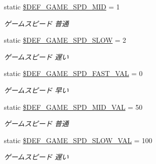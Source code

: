 \begin{DoxyCompactItemize}
static \hyperlink{class_reversi_const_a193b49bd2c83732144f045f9a50aa33e}{\$\+D\+E\+F\+\_\+\+G\+A\+M\+E\+\_\+\+S\+P\+D\+\_\+\+M\+ID} = 1
\begin{DoxyCompactList}\small\item\em ゲームスピード 普通 \end{DoxyCompactList}\item 
\mbox{\label{class_reversi_const_a0b3dc06c436244edd6720ad50a6eb673}} 
static \hyperlink{class_reversi_const_a0b3dc06c436244edd6720ad50a6eb673}{\$\+D\+E\+F\+\_\+\+G\+A\+M\+E\+\_\+\+S\+P\+D\+\_\+\+S\+L\+OW} = 2
\begin{DoxyCompactList}\small\item\em ゲームスピード 遅い \end{DoxyCompactList}\item 
\mbox{\label{class_reversi_const_a482c8f8dd0e67619fda3f134ab0a011c}} 
static \hyperlink{class_reversi_const_a482c8f8dd0e67619fda3f134ab0a011c}{\$\+D\+E\+F\+\_\+\+G\+A\+M\+E\+\_\+\+S\+P\+D\+\_\+\+F\+A\+S\+T\+\_\+\+V\+AL} = 0
\begin{DoxyCompactList}\small\item\em ゲームスピード 早い \end{DoxyCompactList}\item 
\mbox{\label{class_reversi_const_ac370025cba197235c70bb8adf896adf8}} 
static \hyperlink{class_reversi_const_ac370025cba197235c70bb8adf896adf8}{\$\+D\+E\+F\+\_\+\+G\+A\+M\+E\+\_\+\+S\+P\+D\+\_\+\+M\+I\+D\+\_\+\+V\+AL} = 50
\begin{DoxyCompactList}\small\item\em ゲームスピード 普通 \end{DoxyCompactList}\item 
\mbox{\label{class_reversi_const_ab34ef73bafe6b461bd6c352e393428c4}} 
static \hyperlink{class_reversi_const_ab34ef73bafe6b461bd6c352e393428c4}{\$\+D\+E\+F\+\_\+\+G\+A\+M\+E\+\_\+\+S\+P\+D\+\_\+\+S\+L\+O\+W\+\_\+\+V\+AL} = 100
\begin{DoxyCompactList}\small\item\em ゲームスピード 遅い \end{DoxyCompactList}\item 
\mbox{\label{class_reversi_const_a6fa812c8bbe57a64fd92223fd3b71086}} 

\end{DoxyCompactItemize}

